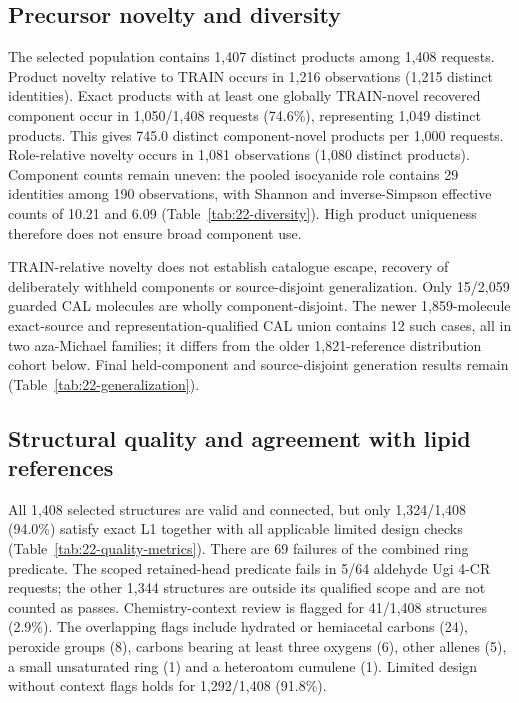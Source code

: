 \subsection{Precursor novelty and diversity}
The selected population contains 1,407 distinct products among 1,408 requests. Product novelty
relative to TRAIN occurs in 1,216 observations (1,215 distinct identities). Exact products with at
least one globally TRAIN-novel recovered component occur in 1,050/1,408 requests (74.6\%),
representing 1,049 distinct products. This gives 745.0 distinct component-novel products per 1,000
requests. Role-relative novelty occurs in 1,081 observations (1,080 distinct products).
Component counts remain uneven: the pooled isocyanide role contains 29 identities among 190
observations, with Shannon and inverse-Simpson effective counts of 10.21 and 6.09
(Table~\ref{tab:22-diversity}). High product uniqueness therefore does not ensure broad component use.

TRAIN-relative novelty does not establish catalogue escape, recovery of deliberately withheld
components or source-disjoint generalization. Only 15/2,059 guarded CAL molecules are wholly
component-disjoint. The newer 1,859-molecule exact-source and representation-qualified CAL union
contains 12 such cases, all in two aza-Michael families; it differs from the older 1,821-reference
distribution cohort below. Final held-component and source-disjoint generation results remain
 (Table~\ref{tab:22-generalization}).

\subsection{Structural quality and agreement with lipid references}
All 1,408 selected structures are valid and connected, but only 1,324/1,408 (94.0\%) satisfy exact
L1 together with all applicable limited design checks (Table~\ref{tab:22-quality-metrics}).
There are 69 failures of the combined ring predicate. The scoped retained-head predicate fails in
5/64 aldehyde Ugi 4-CR requests; the other 1,344 structures are outside its qualified scope and
are not counted as passes. Chemistry-context review is flagged for 41/1,408 structures (2.9\%).
The overlapping flags include hydrated or hemiacetal carbons (24), peroxide groups (8), carbons
bearing at least three oxygens (6), other allenes (5), a small unsaturated ring (1) and a heteroatom
cumulene (1). Limited design without context flags holds for 1,292/1,408 (91.8\%).


